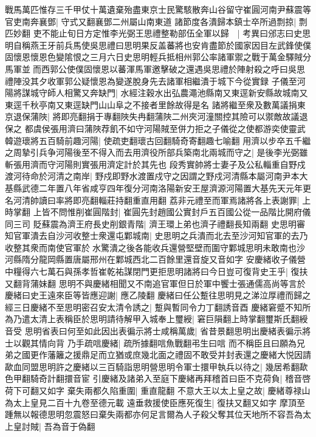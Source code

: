 戰馬萬匹惟存三千甲仗十萬遺棄殆盡東京士民驚駭散奔山谷留守崔圓河南尹蘇震等官吏南奔襄鄧|{
	守式又翻襄鄧二州屬山南東道}
諸節度各潰歸本鎮士卒所過剽掠|{
	剽匹妙翻}
吏不能止旬日方定惟李光弼王思禮整勒部伍全軍以歸　|{
	考異曰邠志曰史思明自稱燕王牙前兵馬使吳思禮曰思明果反盖蕃將也安肯盡節於國家因目左武鋒使僕固懷恩懷恩色變隂恨之三月六日史思明輕兵抵相州郭公率諸軍禦之戰于萬金驛賊分馬軍並而西郭公使僕固懷恩以蕃渾馬軍邀擊破之還遇吳思禮於陣射殺之呼曰吳思禮陣没其夕收軍郭公疑懷恩為變遂脫身先去諸軍相繼潰于城下今從實録}
子儀至河陽將謀城守師人相驚又奔缺門|{
	水經注穀水出弘農澠池縣南又東逕新安縣故城南又東逕千秋亭南又東逕缺門山山阜之不接者里餘故得是名}
諸將繼至衆及數萬議捐東京退保蒲陜|{
	將即亮翻捐于專翻陜失冉翻蒲陜二州夾河潼關控其險可以禦敵故議退保之}
都虞侯張用濟曰蒲陜荐飢不如守河陽賊至併力拒之子儀從之使都游奕使靈武韓遊瓌將五百騎前趣河陽|{
	使疏吏翻瓌古回翻騎奇寄翻趣七喻翻}
用濟以步卒五千繼之周摯引兵争河陽後至不得入而去用濟役所部兵築南北兩城而守之|{
	是後李光弼雖斬張用濟而守河陽則實張用濟定計於其先也}
段秀實帥將士妻子及公私輜重自野戍渡河待命於河清之南岸|{
	野戍即野水渡置戍守之因謂之野戍河清縣本屬河南尹本大基縣武德二年置八年省咸亨四年復分河南洛陽新安王屋濟源河陽置大基先天元年更名河清帥讀曰率將即亮翻輜莊持翻重直用翻}
荔非元禮至而軍焉諸將各上表謝罪|{
	上時掌翻}
上皆不問惟削崔圓階封|{
	崔圓先封趙國公實封戶五百國公從一品階比開府儀同三司}
貶蘇震為濟王府長史削銀青階|{
	濟王環上弟也濟子禮翻長知兩翻}
史思明審知官軍潰去自沙河收整士衆還屯鄴城南|{
	史思明之兵潰而北去至沙河知官軍的去乃收整其衆而南使官軍於水驚潰之後各能收兵還營堅壁而圍守鄴城思明未敢南也沙河縣隋分龍岡縣置唐屬邢州在鄴城西北二百餘里還音旋又音如字}
安慶緒收子儀營中糧得六七萬石與孫孝哲崔乾祐謀閉門更拒思明諸將曰今日豈可復背史王乎|{
	復扶又翻背蒲妹翻}
思明不與慶緒相聞又不南追官軍但日於軍中饗士張通儒高尚等言於慶緒曰史王遠來臣等皆應迎謝|{
	應乙陵翻}
慶緒曰任公蹔往思明見之涕泣厚禮而歸之經三日慶緒不至思明密召安太清令誘之|{
	蹔與暫同令力丁翻誘音酉}
慶緒窘蹙不知所為乃遣太清上表稱臣於思明請待解甲入城奉上璽綬|{
	窘巨隕翻上時掌翻璽斯氏翻綬音受}
思明省表曰何至如此因出表徧示將士咸稱萬歲|{
	省昔景翻思明出慶緒表徧示將士以觀其情向背}
乃手疏唁慶緒|{
	疏所據翻唁魚戰翻弔生曰唁}
而不稱臣且曰願為兄弟之國更作藩籬之援鼎足而立猶或庶幾北面之禮固不敢受并封表還之慶緒大悦因請歃血同盟思明許之慶緒以三百騎詣思明營思明令軍士擐甲執兵以待之|{
	幾居希翻歃色甲翻騎奇計翻擐音宦}
引慶緒及諸弟入至庭下慶緒再拜稽首曰臣不克荷負|{
	稽音啓荷下可翻又如字}
棄失兩都久陷重圍|{
	重直龍翻}
不意大王以太上皇之故|{
	慶緒尊禄山為太上皇見二百十九卷至德元載}
遠垂救援使臣應死復生|{
	復扶又翻又如字}
摩頂至踵無以報德思明忽震怒曰棄失兩都亦何足言爾為人子殺父奪其位天地所不容吾為太上皇討賊|{
	吾為音于偽翻}
